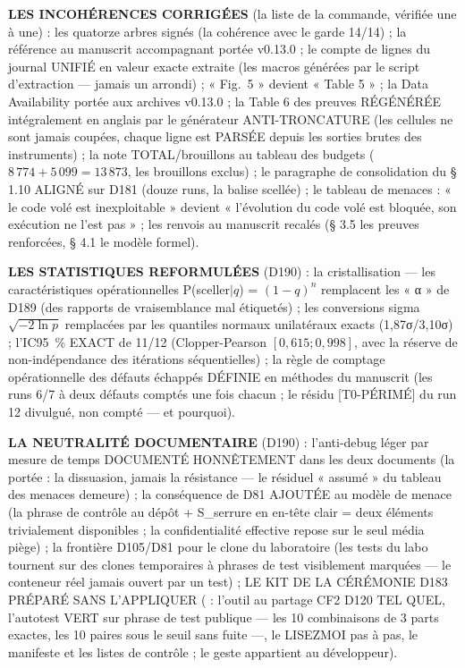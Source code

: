 \textbf{LES INCOHÉRENCES CORRIGÉES} (la liste de la commande, vérifiée une à
une) : les quatorze arbres signés (la cohérence avec le garde 14/14) ; la
référence au manuscrit accompagnant portée v0.13.0 ; le compte de lignes du
journal UNIFIÉ en valeur exacte extraite (les macros générées par le script
d'extraction — jamais un arrondi) ; « Fig.~5 » devient « Table 5 » ; la Data
Availability portée aux archives v0.13.0 ; la Table 6 des preuves RÉGÉNÉRÉE
intégralement en anglais par le générateur ANTI-TRONCATURE (les cellules ne
sont jamais coupées, chaque ligne est PARSÉE depuis les sorties brutes des
instruments) ; la note TOTAL/brouillons au tableau des budgets ($8\,774 +
5\,099 = 13\,873$, les brouillons exclus) ; le paragraphe de consolidation
du § 1.10 ALIGNÉ sur D181 (douze runs, la balise  scellée) ;
le tableau de menaces : « le code volé est inexploitable » devient
« l'évolution du code volé est bloquée, son exécution ne l'est pas » ; les
renvois au manuscrit recalés (§ 3.5 les preuves renforcées, § 4.1 le modèle
formel).

\textbf{LES STATISTIQUES REFORMULÉES} (D190) : la cristallisation — les
caractéristiques opérationnelles P(sceller$|q$) = $(1-q)^n$ remplacent les
« α » de D189 (des rapports de vraisemblance mal étiquetés) ; les conversions
sigma $\sqrt{-2\ln p}$ remplacées par les quantiles normaux unilatéraux
exacts (1,87σ/3,10σ) ; l'IC95~\% EXACT de 11/12 (Clopper-Pearson
$[0,615 ; 0,998]$, avec la réserve de non-indépendance des itérations
séquentielles) ; la règle de comptage opérationnelle des défauts échappés
DÉFINIE en méthodes du manuscrit (les runs 6/7 à deux défauts comptés une
fois chacun ; le résidu [T0-PÉRIMÉ] du run 12 divulgué, non compté — et
pourquoi).

\textbf{LA NEUTRALITÉ DOCUMENTAIRE} (D190) : l'anti-debug léger par mesure
de temps DOCUMENTÉ HONNÊTEMENT dans les deux documents (la portée : la
dissuasion, jamais la résistance — le résiduel « assumé » du tableau des
menaces demeure) ; la conséquence de D81 AJOUTÉE au modèle de menace (la
phrase de contrôle au dépôt + S\_serrure en en-tête clair = deux éléments
trivialement disponibles ; la confidentialité effective repose sur le seul
média piège) ; la frontière D105/D81 pour le clone du laboratoire (les tests
du labo tournent sur des clones temporaires à phrases de test visiblement
marquées — le conteneur réel jamais ouvert par un test) ; LE KIT DE LA
CÉRÉMONIE D183 PRÉPARÉ SANS L'APPLIQUER ( :
l'outil au partage CF2 D120 TEL QUEL, l'autotest VERT sur phrase de test
publique — les 10 combinaisons de 3 parts exactes, les 10 paires sous le
seuil sans fuite —, le LISEZMOI pas à pas, le manifeste et les listes de
contrôle ; le geste appartient au développeur).

